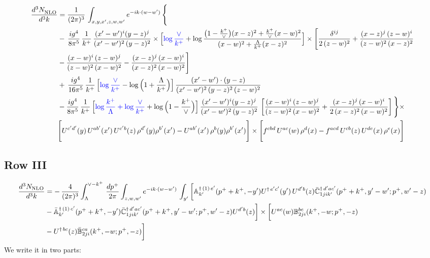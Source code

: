 \documentclass[9pt]{article}
\def\mf#1{\mathbb{#1}}
\numberwithin{equation}{section}
\begin{document}
\begin{align}
     \frac{d^{3}N_{\rm NLO}^{\rm}}{d^{3}k}  & =  \frac{1}{(2\pi)^{3}}\, \int_{x,y,x',z,w,w^{\prime}} e^{-ik\cdot (w-w')}\, \Bigg\{\notag \\ & -\,\frac{ig^{4}}{8\pi^{5}}\,\frac{1}{k^{+}}\,\frac{(x'-w')^{i}(y-z)^{j}}{(x'-w')^{2}\,(y-z)^{2}}\times \Big[{\color{blue}\log\frac{\vee}{k^{+}}}+\log\frac{\big(1-\frac{k^{+}}{\vee}\big)(x-z)^{2}+\frac{k^{+}}{\vee}(x-w)^{2}}{(x-w)^{2}+\frac{\Lambda}{k^{+}}(x-z)^{2}}\Big]\times \Bigg[\frac{\delta^{ij}}{2\,(z-w)^{2}}+\frac{(x-z)^{j}\,(z-w)^{i}}{(z-w)^{2}\,(x-z)^{2}}\notag \\ & -\frac{(x-w)^{i}\,(z-w)^{j}}{(z-w)^{2}\,(x-w)^{2}}-\frac{(x-z)^{j}\,(x-w)^{i}}{(x-z)^{2}\,(x-w)^{2}}\Bigg]\notag \\ & +\,\frac{ig^{4}}{16\pi^{5}}\,\frac{1}{k^{+}}\,\Big[{\color{blue}\log\frac{\vee}{k^{+}}}-\log\Big(1+\frac{\Lambda}{k^{+}}\Big)\Big]\, \frac{(x'-w')\cdot (y-z)}{(x'-w')^{2}\,(y-z)^{2}\,(z-w)^{2}}\notag \\ & -\frac{ig^{4}}{8\pi^{5}}\,\frac{1}{k^{+}}\,\Big[{\color{blue}\log\frac{k^{+}}{\Lambda}+\log\frac{\vee}{k^{+}}}+\log\Big(1-\frac{k^{+}}{\vee}\Big)\Big]\,\frac{(x'-w')^{i}(y-z)^{j}}{(x'-w')^{2}\,(y-z)^{2}}\,\left[\frac{(x-w)^{i}\,(z-w)^{j}}{(z-w)^{2}\,(x-w)^{2}}+\frac{(x-z)^{j}\,(x-w)^{i}}{2\,(x-z)^{2}\, (x-w)^{2}}\right]\Bigg\}\times \notag \\ & \Bigg[U^{c'd'}(y)\,U^{ab'}(x')\,U^{c'b}(z)\,\rho^{d'}(y)\rho^{b'}(x')-U^{ab'}(x')\,\rho^{b}(y)\rho^{b'}(x')\Bigg]\times\Bigg[f^{cbd}\,U^{ac}(w)\,\rho^{d}(x)-f^{acd}\, U^{cb}(z)\,U^{de}(x)\,\rho^{e}(x)\Bigg]
\end{align}
 \subsection{Row III\,}
 \begin{align}
    \frac{d^{3}N_{\rm NLO}}{d^{3}k} & =   -\,\frac{4}{(2\pi)^{3}} \int_{\Lambda}^{\vee -k^{+}}\, \frac{dp^{+}}{2\pi}\int_{z,w,w^{\prime}} e^{-ik\cdot (w-w')}\,\int_{y^{\prime}}\bigg[\mf{A}^{\dagger\, (1)\,e^{\prime}}_{k^{\prime}}(p^{+}+k^{+},-y^{\prime})U^{\dagger\, e^{\prime}c^{\prime}}(y^{\prime})\,U^{d^{\prime}b}(z) \Bar{\mf{C}}^{\dagger\, d^{\prime}ac^{\prime}}_{1jik^{\prime}}(p^{+}+k^{+},y^{\prime}-w^{\prime}; p^{+},w^{\prime}-z)\notag \\ &  -\Bar{\mf{A}}^{\dagger\, (1)\,c^{\prime}}_{k^{\prime}}(p^{+}+k^{+},-y^{\prime}) \Bar{\mf{C}}^{\dagger\, d^{\prime}ac^{\prime}}_{1jik^{\prime}}(p^{+}+k^{+},y^{\prime}-w^{\prime}; p^{+},w^{\prime}-z)U^{d^{\prime}b}(z)\bigg] \times \bigg[U^{ac}(w) \mf{B}^{bc}_{2ji}(k^{+},-w;p^{+},-z)\notag \\ &  -U^{\dagger\, bc}(z)\Bar{\mf{B}}^{ca}_{2ji}(k^{+},-w; p^{+},-z)\bigg]\nonumber
\end{align}
We write it in two parts:
\end{document}
